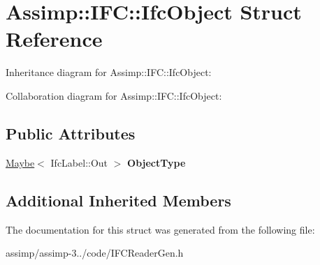 \hypertarget{struct_assimp_1_1_i_f_c_1_1_ifc_object}{\section{Assimp\+:\+:I\+F\+C\+:\+:Ifc\+Object Struct Reference}
\label{struct_assimp_1_1_i_f_c_1_1_ifc_object}
}


Inheritance diagram for Assimp\+:\+:I\+F\+C\+:\+:Ifc\+Object\+:


Collaboration diagram for Assimp\+:\+:I\+F\+C\+:\+:Ifc\+Object\+:
\subsection*{Public Attributes}
\begin{DoxyCompactItemize}
\item 
\hypertarget{struct_assimp_1_1_i_f_c_1_1_ifc_object_a67dc834443c75259e2400789ba5c9f23}{\hyperlink{struct_assimp_1_1_s_t_e_p_1_1_maybe}{Maybe}$<$ Ifc\+Label\+::\+Out $>$ {\bfseries Object\+Type}}\label{struct_assimp_1_1_i_f_c_1_1_ifc_object_a67dc834443c75259e2400789ba5c9f23}

\end{DoxyCompactItemize}
\subsection*{Additional Inherited Members}


The documentation for this struct was generated from the following file\+:\begin{DoxyCompactItemize}
\item 
assimp/assimp-\/3../code/I\+F\+C\+Reader\+Gen.\+h\end{DoxyCompactItemize}
